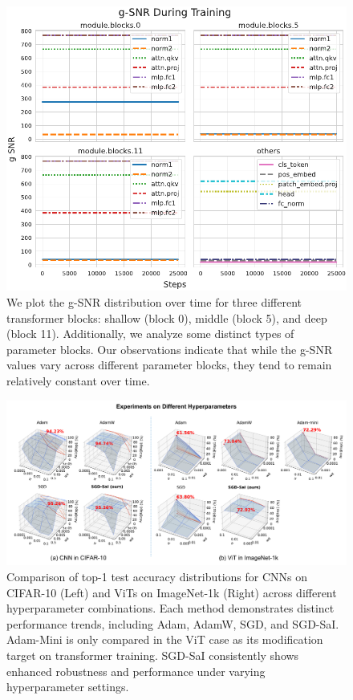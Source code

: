 \begin{figure}[!h]
    \centering
    \includegraphics[width=\linewidth]{images/gsnr_analysis.pdf}
    \caption{We plot the g-SNR distribution over time for three different transformer blocks: shallow (block 0), middle (block 5), and deep (block 11). Additionally, we analyze some distinct types of parameter blocks. Our observations indicate that while the g-SNR values vary across different parameter blocks, they tend to remain relatively constant over time.}
    \label{fig:gsnr_across_time_plot}
\end{figure}


\begin{figure}[h!]
    \centering
        \includegraphics[width=.99\textwidth]{images/combine_3d_scatter_v3.pdf}
    \caption{Comparison of top-1 test accuracy distributions for CNNs on CIFAR-10 (Left) and ViTs on ImageNet-1k (Right) across different hyperparameter combinations. Each method demonstrates distinct performance trends, including Adam, AdamW, SGD, and SGD-SaI. Adam-Mini is only compared in the ViT case as its modification target on transformer training. SGD-SaI consistently shows enhanced robustness and performance under varying hyperparameter settings.}
    \label{fig:fig_vit_cnn_performance_3d_surface}
\end{figure}

